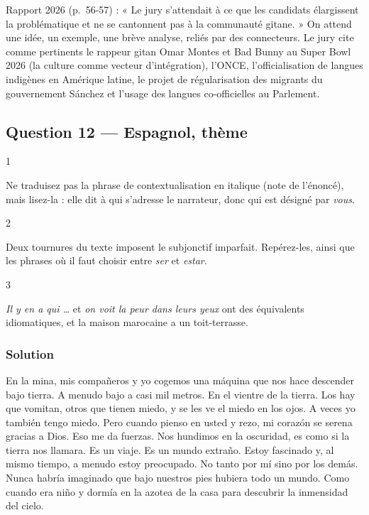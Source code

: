 \documentclass[11pt,a4paper]{article}
\begin{document}
\begin{jury}

Rapport 2026 (p.~56-57) : « Le jury s'attendait à ce que les candidats élargissent la problématique et ne se cantonnent pas à la communauté gitane. » On attend une idée, un exemple, une brève analyse, reliés par des connecteurs. Le jury cite comme pertinents le rappeur gitan Omar Montes et Bad Bunny au Super Bowl 2026 (la culture comme vecteur d'intégration), l'ONCE, l'officialisation de langues indigènes en Amérique latine, le projet de régularisation des migrants du gouvernement Sánchez et l'usage des langues co-officielles au Parlement.

\end{jury}

\hypertarget{question-12-espagnol-thuxe8me}{%
\subsection{Question 12 --- Espagnol, thème}\label{question-12-espagnol-thuxe8me}}

\begin{indication}{1}

Ne traduisez pas la phrase de contextualisation en italique (note de l'énoncé), mais lisez-la : elle dit à qui s'adresse le narrateur, donc qui est désigné par \emph{vous}.

\end{indication}

\begin{indication}{2}

Deux tournures du texte imposent le subjonctif imparfait. Repérez-les, ainsi que les phrases où il faut choisir entre \emph{ser} et \emph{estar}.

\end{indication}

\begin{indication}{3}

\emph{Il y en a qui \ldots{}} et \emph{on voit la peur dans leurs yeux} ont des équivalents idiomatiques, et la maison marocaine a un toit-terrasse.

\end{indication}

\hypertarget{solution-11}{%
\subsubsection{Solution}\label{solution-11}}

En la mina, mis compañeros y yo cogemos una máquina que nos hace descender bajo tierra. A menudo bajo a casi mil metros. En el vientre de la tierra. Los hay que vomitan, otros que tienen miedo, y se les ve el miedo en los ojos. A veces yo también tengo miedo. Pero cuando pienso en usted y rezo, mi corazón se serena gracias a Dios. Eso me da fuerzas. Nos hundimos en la oscuridad, es como si la tierra nos llamara. Es un viaje. Es un mundo extraño. Estoy fascinado y, al mismo tiempo, a menudo estoy preocupado. No tanto por mí sino por los demás. Nunca habría imaginado que bajo nuestros pies hubiera todo un mundo. Como cuando era niño y dormía en la azotea de la casa para descubrir la inmensidad del cielo.
\end{document}
